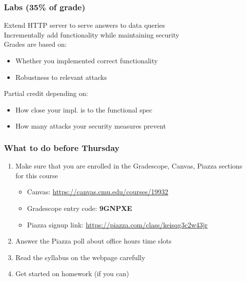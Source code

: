 \documentclass[10pt]{beamer}
\begin{document}

\begin{frame}

\frametitle{Labs (35\% of grade)}

Extend HTTP server to serve answers to data queries
\\[1em]

Incrementally add functionality while maintaining security
\\[1em]

Grades are based on:
\begin{itemize}
\item Whether you implemented correct functionality
\item Robustness to relevant attacks\\[1em]
\end{itemize}

Partial credit depending on:
\begin{itemize}
  \item How close your impl. is to the functional spec
  \item How many attacks your security measures prevent
\end{itemize}

\end{frame}


\begin{frame}

\frametitle{What to do before Thursday}

\begin{enumerate}
  \item Make sure that you are enrolled in the Gradescope, Canvas, Piazza sections for this course
  \begin{itemize}
    \item Canvas: \url{https://canvas.cmu.edu/courses/19932}
    \item Gradescope entry code: \textbf{9GNPXE}
    \item Piazza signup link: \url{https://piazza.com/class/keisqg3c2w43jr}
  \end{itemize}
  \item Answer the Piazza poll about office hours time slots
  \item Read the syllabus on the webpage carefully
  \item Get started on homework (if you can)
\end{enumerate}

\end{frame}
\end{document}
